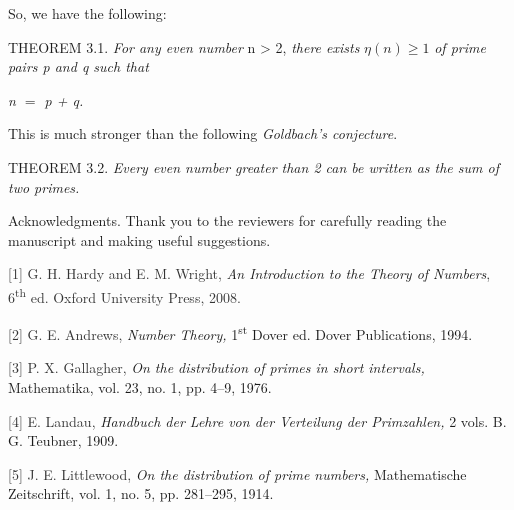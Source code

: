 \documentclass{aomart}
\begin{document}
So, we have the following:
\vspace{1\baselineskip}

THEOREM 3.1.  \textit{For any even number }n > 2, \textit{there exists }\( \eta\left(n\right)\geq 1\)\textit{ of prime pairs p and q such that }

\textit{n $=$ p + q.}

\vspace{1\baselineskip}

This is much stronger than the following \textit{Goldbach’s conjecture}. 

\vspace{1\baselineskip}

THEOREM 3.2.  \textit{Every even number greater than 2 can be written as the sum of two primes.}

\newpage

Acknowledgments. Thank you to the reviewers for carefully reading the manuscript and making useful suggestions.






\textcolor[HTML]{333333}{[1] G. H. Hardy and E. M. Wright, }\textit{An Introduction to the Theory of Numbers}\textcolor[HTML]{333333}{, 6\textsuperscript{th} ed. Oxford University Press, 2008. }

\vspace{1\baselineskip}

\textcolor[HTML]{333333}{[2] G. E. Andrews, }\textit{Number Theory, }1\textsuperscript{st} Dover ed. Dover Publications, 1994.

\vspace{1\baselineskip}

\textcolor[HTML]{333333}{[3] P. X. Gallagher, }\textit{On the distribution of primes in short intervals,} Mathematika, vol. 23, no. 1, pp. 4–9, 1976.

\vspace{1\baselineskip}

\textcolor[HTML]{333333}{[4] E. Landau, }\textit{Handbuch der Lehre von der Verteilung der Primzahlen,} 2 vols. B. G. Teubner, 1909.

\vspace{1\baselineskip}

\textcolor[HTML]{333333}{[5] J. E. Littlewood, }\textit{On the distribution of prime numbers,} Mathematische Zeitschrift, vol. 1, no. 5, pp. 281–295, 1914.

\vspace{1\baselineskip}
\end{document}
